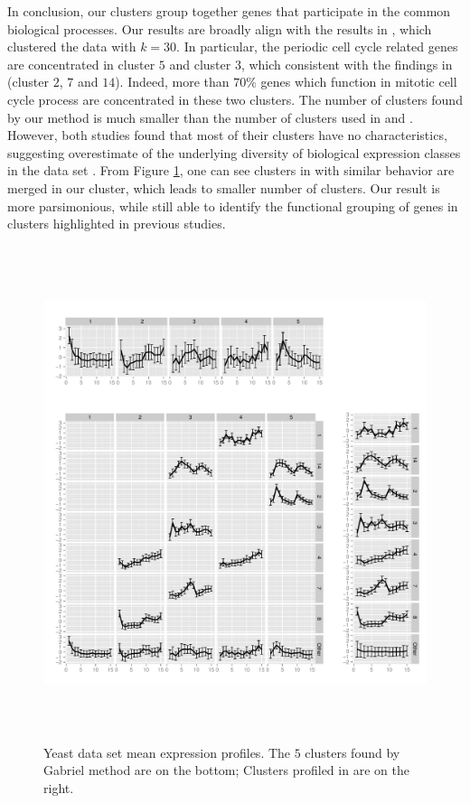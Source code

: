 \documentclass[12pt]{article}
\begin{document}
In conclusion, our clusters group together genes that participate in the common biological processes. Our results are broadly align with the results in \cite{tavazoie1999systematic}, which clustered the data with $k=30$. In particular, the periodic cell cycle related genes are concentrated in cluster $5$ and cluster $3$, which consistent with the findings in \cite{tavazoie1999systematic} (cluster $2$, $7$ and $14$). Indeed, more than $70\%$ genes which function in mitotic cell cycle process are concentrated in these two clusters. The number of clusters found by our method is much smaller than the number of clusters used in \cite{tavazoie1999systematic} and \cite{dortet2008model}. However, both studies found that most of their clusters have no characteristics, suggesting overestimate of the underlying diversity of biological expression classes in the data set \citep{tavazoie1999systematic}. From Figure \ref{fig:5_clusters}, one can see clusters in \cite{tavazoie1999systematic} with similar behavior are merged in our cluster, which leads to smaller number of clusters. Our result is more parsimonious, while still able to identify the functional grouping of genes in clusters highlighted in previous studies.


	\begin{figure}[H]
		\centering
	\includegraphics[width=5.7in, height=5.7in]{wei/split_plots.pdf}
	\caption{Yeast data set mean expression profiles. The $5$ clusters found by Gabriel method are on the bottom; Clusters profiled in \cite{tavazoie1999systematic} are on the right.}
	\label{fig:5_clusters}
	\end{figure}	
\end{document}
